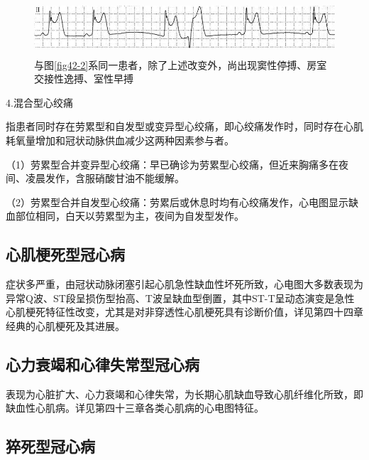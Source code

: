 \begin{figure}[!htbp]
 \centering
 \includegraphics[width=5.58333in,height=0.80208in]{./images/Image00695.jpg}
 \captionsetup{justification=centering}
 \caption{与图\ref{fig42-2}系同一患者，除了上述改变外，尚出现窦性停搏、房室交接性逸搏、室性早搏}
 \label{fig42-4}
  \end{figure} 

4.混合型心绞痛

指患者同时存在劳累型和自发型或变异型心绞痛，即心绞痛发作时，同时存在心肌耗氧量增加和冠状动脉供血减少这两种因素参与者。

（1）劳累型合并变异型心绞痛：早已确诊为劳累型心绞痛，但近来胸痛多在夜间、凌晨发作，含服硝酸甘油不能缓解。

（2）劳累型合并自发型心绞痛：劳累后或休息时均有心绞痛发作，心电图显示缺血部位相同，白天以劳累型为主，夜间为自发型发作。

\protect\hypertarget{text00050.htmlux5cux23subid589}{}{}

\subsection{心肌梗死型冠心病}

症状多严重，由冠状动脉闭塞引起心肌急性缺血性坏死所致，心电图大多数表现为异常Q波、ST段呈损伤型抬高、T波呈缺血型倒置，其中ST-T呈动态演变是急性心肌梗死特征性改变，尤其是对非穿透性心肌梗死具有诊断价值，详见第四十四章经典的心肌梗死及其进展。

\protect\hypertarget{text00050.htmlux5cux23subid590}{}{}

\subsection{心力衰竭和心律失常型冠心病}

表现为心脏扩大、心力衰竭和心律失常，为长期心肌缺血导致心肌纤维化所致，即缺血性心肌病。详见第四十三章各类心肌病的心电图特征。

\protect\hypertarget{text00050.htmlux5cux23subid591}{}{}

\subsection{猝死型冠心病}

